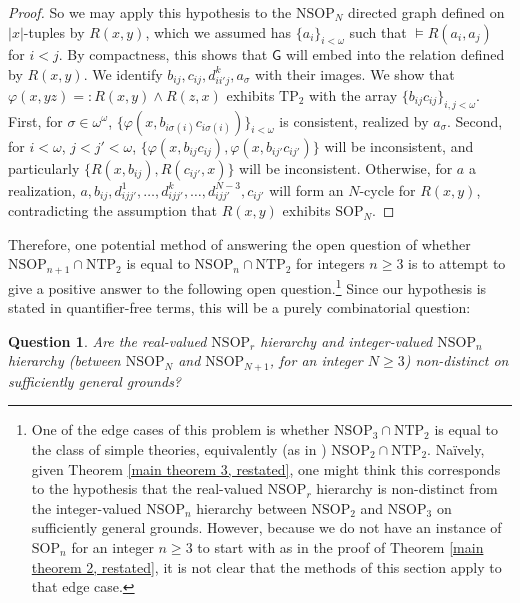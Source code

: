 \documentclass{amsart}
\newtheorem{question}[theorem]{Question}
\theoremstyle{definition}
\theoremstyle{remark}
\numberwithin{equation}{section}
\begin{document}
\begin{proof}
So we may apply this hypothesis to the $\mathrm{NSOP}_{N}$ directed graph defined on $|x|$-tuples by $R(x,y)$, which we assumed has $\{a_{i}\}_{i < \omega}$ such that $\models R(a_i, a_j)$ for $i < j$. By compactness, this shows that $\mathsf{G}$ will embed into the relation defined by $R(x, y)$. We identify $b_{ij}, c_{ij}, d^{k}_{ii'j}, a_{\sigma}$ with their images. We show that $\varphi(x, yz) = : R(x, y) \wedge R(z, x)$ exhibits $\mathrm{TP}_{2}$ with the array $\{b_{ij}c_{ij}\}_{i, j < \omega}$. First, for $\sigma \in \omega^{\omega}$, $\{\varphi(x, b_{i \sigma(i)}c_{i \sigma(i)})\}_{i < \omega}$ is consistent, realized by $a_{\sigma}$. Second, for $i < \omega$, $j < j' < \omega$, $\{\varphi(x, b_{ij}c_{ij}), \varphi(x, b_{ij'}c_{ij'}) \}$ will be inconsistent, and particularly $\{R(x, b_{ij}), R(c_{ij'}, x) \}$ will be inconsistent. Otherwise, for $a$ a realization, $a, b_{ij}, d^{1}_{ijj'}, \ldots, d^{k}_{ijj'}, \ldots, d^{N-3}_{ijj'}, c_{ij'}$ will form an $N$-cycle for $R(x, y)$, contradicting the assumption that $R(x, y)$ exhibits $\mathrm{SOP}_{N}$.


\end{proof}

Therefore, one potential method of answering the open question of whether $\mathrm{NSOP}_{n+1} \cap \mathrm{NTP}_{2}$ is equal to $\mathrm{NSOP}_{n} \cap \mathrm{NTP}_{2}$ for integers $n \geq 3$ is to attempt to give a positive answer to the following open question.\footnote{One of the edge cases of this problem is whether $\mathrm{NSOP}_{3} \cap \mathrm{NTP}_{2}$ is equal to the class of simple theories, equivalently (as in \cite{Sh90}) $\mathrm{NSOP}_{2} \cap \mathrm{NTP}_{2}$. Naïvely, given Theorem \ref{main theorem 3, restated}, one might think this corresponds to the hypothesis that the real-valued $\mathrm{NSOP}_{r}$ hierarchy is non-distinct from the integer-valued $\mathrm{NSOP}_{n}$ hierarchy between $\mathrm{NSOP}_{2}$ and $\mathrm{NSOP}_{3}$ on sufficiently general grounds. However, because we do not have an instance of $\mathrm{SOP}_{n}$ for an integer $n \geq 3$ to start with as in the proof of Theorem \ref{main theorem 2, restated}, it is not clear that the methods of this section apply to that edge case. } Since our hypothesis is stated in quantifier-free terms, this will be a purely combinatorial question:

\begin{question}\label{general non-distinctness question}
    Are the real-valued $\mathrm{NSOP}_{r}$ hierarchy and integer-valued $\mathrm{NSOP}_{n}$ hierarchy (between $\mathrm{NSOP}_{N}$ and $\mathrm{NSOP}_{N+1}$, for an integer $N\geq 3$) non-distinct on sufficiently general grounds?
\end{question}
\end{document}
